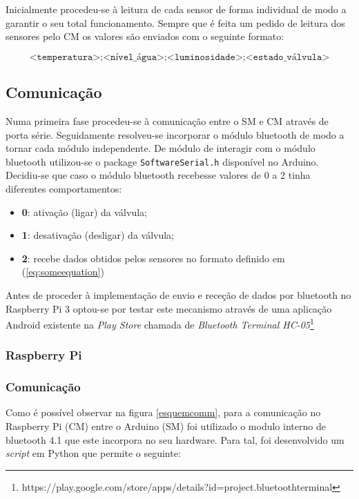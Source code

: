 Inicialmente procedeu-se à leitura de cada sensor de forma individual de modo a garantir o seu total funcionamento. Sempre que é feita um pedido de leitura dos sensores pelo \ac{CM} os valores são enviados com o seguinte formato: 

\begin{equation} 
\label{eq:someequation}
\texttt{<temperatura>;<nível\_água>;<luminosidade>;<estado\_válvula>}
\end{equation}

\subsection{Comunicação}


Numa primeira fase procedeu-se à comunicação entre o \ac{SM} e \ac{CM} através de porta série. Seguidamente resolveu-se incorporar o módulo bluetooth de modo a tornar cada módulo independente. De módulo de interagir com o módulo bluetooth utilizou-se o package \texttt{SoftwareSerial.h} disponível no Arduino. Decidiu-se que caso o módulo bluetooth recebesse valores de 0 a 2 tinha diferentes comportamentos: 

\begin{itemize}
	\item \textbf{0}: ativação (ligar) da válvula; 
	\item \textbf{1}: desativação (desligar) da válvula; 
	\item \textbf{2}: recebe dados obtidos pelos sensores no formato definido em (\ref{eq:someequation})
\end{itemize}

Antes de proceder à implementação de envio e receção de dados por bluetooth no Raspberry Pi 3 optou-se por testar este mecanismo através de uma aplicação Android existente na \textit{Play Store} chamada de \textit{Bluetooth Terminal HC-05}\footnote{https://play.google.com/store/apps/details?id=project.bluetoothterminal}

\subsubsection{Raspberry Pi}


\subsubsection{Comunicação}


Como é possível observar na figura \ref{esquemcomm}, para a comunicação no Raspberry Pi (\ac{CM}) entre o Arduino (\ac{SM}) foi utilizado o modulo interno de bluetooth 4.1 que este incorpora no seu hardware. Para tal, foi desenvolvido um \textit{script} em Python que permite o seguinte: 


